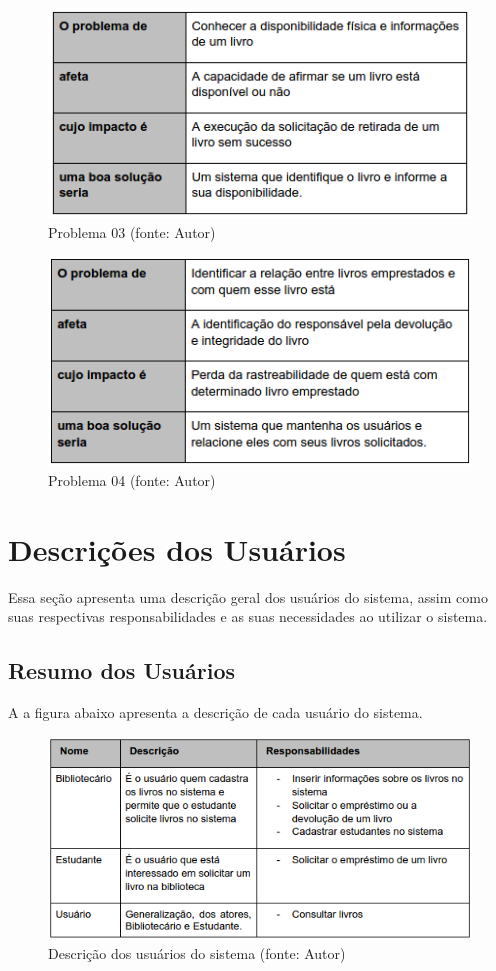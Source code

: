 \begin{figure}[!h]
\centering
\includegraphics[scale=0.65, angle = 360]{figuras/descricao_problema3}
\caption[]{Problema 03 (fonte: Autor)}
\end{figure}
\FloatBarrier

\begin{figure}[!h]
\centering
\includegraphics[scale=0.65, angle = 360]{figuras/descricao_problema4}
\caption[]{Problema 04 (fonte: Autor)}
\end{figure}
\FloatBarrier

\section{Descrições dos Usuários}
Essa seção apresenta uma descrição geral dos usuários do sistema, assim como suas respectivas responsabilidades e as suas necessidades ao utilizar o sistema.

\subsection{Resumo dos Usuários}
A a figura abaixo apresenta a descrição de cada usuário do sistema.

\begin{figure}[!h]
\centering
\includegraphics[scale=0.65, angle = 360]{figuras/descricao_usuarios_soft}
\caption[]{Descrição dos usuários do sistema (fonte: Autor)}
\end{figure}
\FloatBarrier

